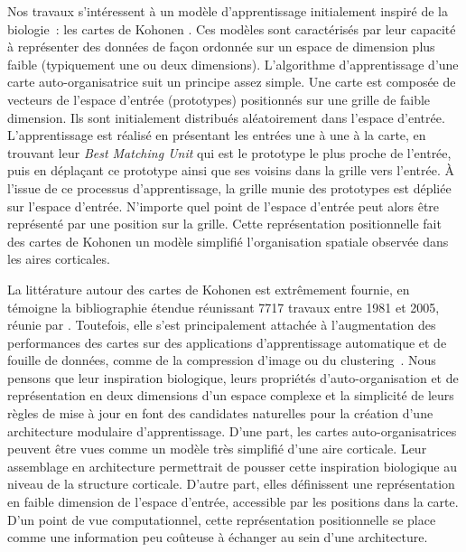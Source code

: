 Nos travaux s'intéressent à un modèle d'apprentissage initialement inspiré de la biologie~: les cartes de Kohonen \parencite{Kohonen1982}.
Ces modèles sont caractérisés par leur capacité à représenter des données de façon ordonnée sur un espace de dimension plus faible (typiquement une ou deux dimensions).
L'algorithme d'apprentissage d'une carte auto-organisatrice suit un principe assez simple. Une carte est composée de vecteurs de l'espace d'entrée (prototypes) positionnés sur une grille de faible dimension.
Ils sont initialement distribués aléatoirement dans l'espace d'entrée. 
L'apprentissage est réalisé en présentant les entrées une à une à la carte, en trouvant leur \emph{Best Matching Unit} qui est le prototype le plus proche de l'entrée, puis en déplaçant ce prototype ainsi que ses voisins dans la grille vers l'entrée.
\`A l'issue de ce processus d'apprentissage, la grille munie des prototypes est dépliée sur l'espace d'entrée. N'importe quel point de l'espace d'entrée peut alors être représenté par une position sur la grille.
Cette représentation positionnelle fait des cartes de Kohonen un modèle simplifié l'organisation spatiale observée dans les aires corticales.

La littérature autour des cartes de Kohonen est extrêmement fournie, en témoigne la bibliographie étendue réunissant 7717 travaux entre 1981 et 2005, réunie par \cite{Kaski1998BibliographyOS,oja_bibliography_2002,Honkela2009BIBLIOGRAPHYOS}.
Toutefois, elle s'est principalement attachée à l'augmentation des performances des cartes sur des applications d'apprentissage automatique et de fouille de données, comme de la compression d'image ou du clustering~\parencite{kohonen_essentials_2013}.
Nous pensons que leur inspiration biologique, leurs propriétés d'auto-organisation et de représentation en deux dimensions d'un espace complexe et la simplicité de leurs règles de mise à jour en font des candidates naturelles pour la création d'une architecture modulaire d'apprentissage.
D'une part, les cartes auto-organisatrices peuvent être vues comme un modèle très simplifié d'une aire corticale. Leur assemblage en architecture permettrait de pousser cette inspiration biologique au niveau de la structure corticale.
D'autre part, elles définissent une représentation en faible dimension de l'espace d'entrée, accessible par les positions dans la carte.
D'un point de vue computationnel, cette représentation positionnelle se place comme une information peu coûteuse à échanger au sein d'une architecture.


